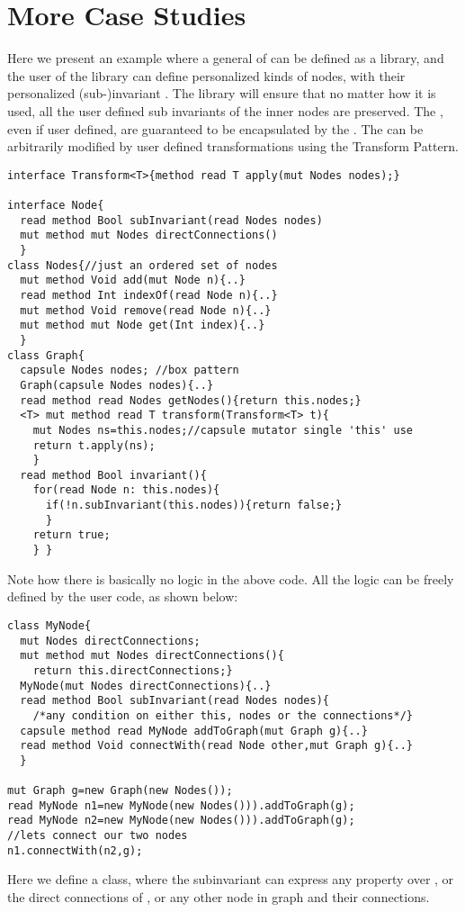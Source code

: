 

\section{More Case Studies}
\label{s:MoreCaseStudies}

Here we present an example where a general \Q@Graph@
of \Q@Node@s can be defined as a library,
and the user of the library can define personalized kinds of nodes,
with their personalized (sub-)invariant \Q@subInvariant@.
The library will ensure that no matter how it is used, all the 
user defined sub invariants of the inner nodes are preserved.
The \Q@Node@s, even if user defined, are guaranteed to be encapsulated by the \Q@Graph@.
The \Q@Graph@ can be arbitrarily modified by user defined transformations using the Transform Pattern.
\begin{lstlisting}
interface Transform<T>{method read T apply(mut Nodes nodes);}

interface Node{
  read method Bool subInvariant(read Nodes nodes)
  mut method mut Nodes directConnections()
  }
class Nodes{//just an ordered set of nodes 
  mut method Void add(mut Node n){..}
  read method Int indexOf(read Node n){..}
  mut method Void remove(read Node n){..}
  mut method mut Node get(Int index){..}
  }
class Graph{ 
  capsule Nodes nodes; //box pattern
  Graph(capsule Nodes nodes){..}
  read method read Nodes getNodes(){return this.nodes;}
  <T> mut method read T transform(Transform<T> t){
    mut Nodes ns=this.nodes;//capsule mutator single 'this' use
    return t.apply(ns);
    }
  read method Bool invariant(){
    for(read Node n: this.nodes){
      if(!n.subInvariant(this.nodes)){return false;}
      }
    return true;
    } }
\end{lstlisting}
Note how there is basically no logic in the above code.
All the logic can be freely defined by the user code, as shown below:

\begin{lstlisting}
class MyNode{
  mut Nodes directConnections;
  mut method mut Nodes directConnections(){
    return this.directConnections;}
  MyNode(mut Nodes directConnections){..}
  read method Bool subInvariant(read Nodes nodes){
    /*any condition on either this, nodes or the connections*/}  
  capsule method read MyNode addToGraph(mut Graph g){..}
  read method Void connectWith(read Node other,mut Graph g){..}
  }

mut Graph g=new Graph(new Nodes());
read MyNode n1=new MyNode(new Nodes())).addToGraph(g);
read MyNode n2=new MyNode(new Nodes())).addToGraph(g);
//lets connect our two nodes
n1.connectWith(n2,g);
\end{lstlisting}
Here we define a \Q@MyNode@ class, where the subinvariant can express any property over \Q@this@, or the direct connections of \Q@this@, or any other node in graph and their connections.

